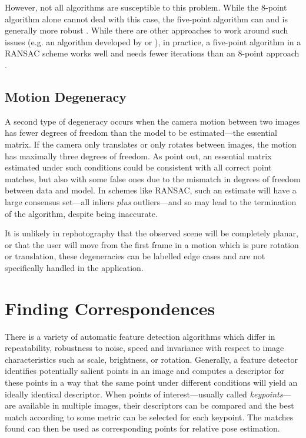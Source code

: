However, not all algorithms are susceptible to this problem. While the 8-point
algorithm alone cannot deal with this case, the five-point algorithm can and is
generally more robust \citep{li2006}. While there are other approaches to work
around such issues (e.g. an algorithm developed by \citet{chum2005} or
\citet{decker2008}), in practice, a five-point algorithm in a RANSAC scheme
works well and needs fewer iterations than an 8-point approach \citep{li2006}.

\subsection{Motion Degeneracy}
\label{subsec:motion_degen}

A second type of degeneracy occurs when the camera motion between two images has
fewer degrees of freedom than the model to be estimated---the essential matrix.
If the camera only translates or only rotates between images, the motion has
maximally three degrees of freedom. As \citet{decker2008} point out, an
essential matrix estimated under such conditions could be consistent with all
correct point matches, but also with some false ones due to the mismatch in
degrees of freedom between data and model. In schemes like RANSAC, such an
estimate will have a large consensus set---all inliers \emph{plus}
outliers---and so may lead to the termination of the algorithm, despite being
inaccurate.

It is unlikely in rephotography that the observed scene will be completely
planar, or that the user will move from the first frame in a motion which is
pure rotation or translation, these degeneracies can be labelled edge cases and
are not specifically handled in the application.

\section{Finding Correspondences}

There is a variety of automatic feature detection algorithms which differ in
repeatability, robustness to noise, speed and invariance with respect to image
characteristics such as scale, brightness, or rotation. 
Generally, a feature detector identifies potentially salient points in an image
and computes a descriptor for these points in a way that the same point under
different conditions will yield an ideally identical descriptor. When points of
interest---usually called \emph{keypoints}---are available in multiple images,
their descriptors can be compared and the best match according to some metric
can be selected for each keypoint. The matches found can then be used as
corresponding points for relative pose estimation.

